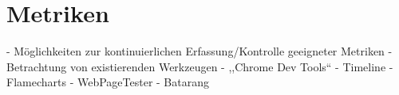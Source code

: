 \section{Metriken}

- Möglichkeiten zur kontinuierlichen Erfassung/Kontrolle geeigneter Metriken
- Betrachtung von existierenden Werkzeugen
  - ,,Chrome Dev Tools``
    - Timeline
    - Flamecharts
  - WebPageTester
  - Batarang
